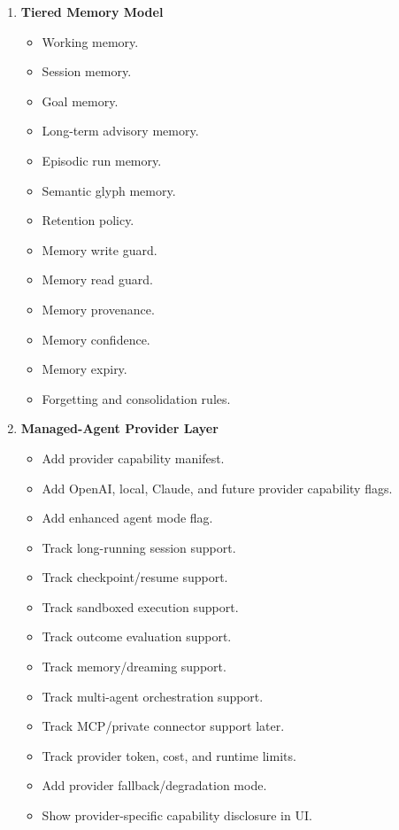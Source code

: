 \begin{enumerate}
  \item \textbf{Tiered Memory Model}
  \begin{itemize}
    \item Working memory.
    \item Session memory.
    \item Goal memory.
    \item Long-term advisory memory.
    \item Episodic run memory.
    \item Semantic glyph memory.
    \item Retention policy.
    \item Memory write guard.
    \item Memory read guard.
    \item Memory provenance.
    \item Memory confidence.
    \item Memory expiry.
    \item Forgetting and consolidation rules.
  \end{itemize}

  \item \textbf{Managed-Agent Provider Layer}
  \begin{itemize}
    \item Add provider capability manifest.
    \item Add OpenAI, local, Claude, and future provider capability flags.
    \item Add enhanced agent mode flag.
    \item Track long-running session support.
    \item Track checkpoint/resume support.
    \item Track sandboxed execution support.
    \item Track outcome evaluation support.
    \item Track memory/dreaming support.
    \item Track multi-agent orchestration support.
    \item Track MCP/private connector support later.
    \item Track provider token, cost, and runtime limits.
    \item Add provider fallback/degradation mode.
    \item Show provider-specific capability disclosure in UI.
  \end{itemize}


\end{enumerate}
